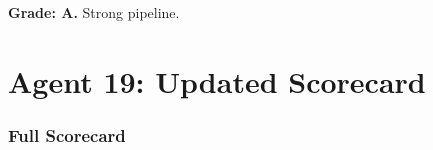 \documentclass[11pt,a4paper]{article}
\begin{document}
\begin{tcolorbox}[colback=green!5!white, colframe=green!60!black, title={Agent 18: 132 Paper Proposals, 4 Near Completion}]
\textbf{Grade: A.} Strong pipeline.
\end{tcolorbox}


\part{Agent 19: Updated Scorecard}
\label{part:scorecard}

\section{Full Scorecard}
\end{document}
